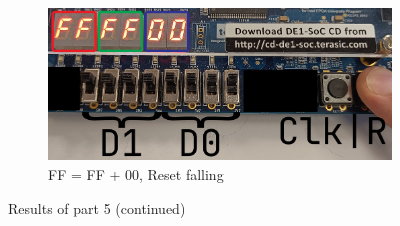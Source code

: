 \documentclass{article}
\begin{document}
\begin{figure}[h]
    \begin{subfigure}[t]{0.7\textwidth}
        \centering
        \includegraphics[width=1\textwidth]{Figures/Part5_8.jpg}
        \caption{FF = FF + 00, Reset falling}
        \label{fig:p5_8}
    \end{subfigure}
    \caption[]{Results of part 5 (continued)}
\end{figure}
\end{document}

